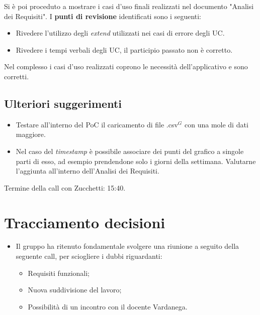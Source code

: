 \noindent
Si è poi proceduto a mostrare i casi d'uso finali realizzati nel documento "Analisi dei Requisiti".
I \textbf{punti di revisione} identificati sono i seguenti:
\begin{itemize}
	\item Rivedere l'utilizzo degli \textit{extend} utilizzati nei casi di errore degli UC.
	\item Rivedere i tempi verbali degli UC, il participio passato non è corretto.
\end{itemize}
Nel complesso i casi d'uso realizzati coprono le necessità dell'applicativo e sono corretti.

\subsection{Ulteriori suggerimenti}
\begin{itemize}
	\item Testare all'interno del PoC il caricamento di file .csv$^{G}$ con una mole di dati maggiore.
	\item Nel caso del \textit{timestamp} è possibile associare dei punti del grafico a singole parti di esso, ad esempio prendendone solo i giorni della settimana. Valutarne l'aggiunta all'interno dell'Analisi dei Requisiti.
\end{itemize}

\noindent Termine della call con Zucchetti: 15:40.



\section{Tracciamento decisioni}
\begin{itemize}
	\item Il gruppo ha ritenuto fondamentale svolgere una riunione a seguito della seguente call, per sciogliere i dubbi riguardanti: 
	\begin{itemize}
		\item Requisiti funzionali;
		\item Nuova suddivisione del lavoro;
		\item Possibilità di un incontro con il docente Vardanega.
	\end{itemize}
\end{itemize}